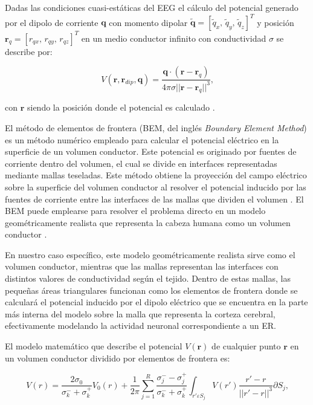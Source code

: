 Dadas las condiciones cuasi-estáticas del EEG \cite{Plonsey1967} el cálculo del potencial generado por el dipolo de corriente $\mathbf{q}$ con momento dipolar  $\mathbf{\tilde{q}} = [\tilde{q}_x,\,\tilde{q}_y,\,\tilde{q}_z]^T$ y posición $\mathbf{r}_{q} = [r_{qx},\,r_{qy},\,r_{qz}]^T$ en un medio conductor infinito con conductividad $\sigma$ se describe por:

\begin{equation}
	\label{fdip}
	V(\mathbf{r},\mathbf{r}_{dip},\mathbf{q})=\frac{\mathbf{q}\cdot(\mathbf{r}-\mathbf{r}_{q})}{4\pi \sigma {||\mathbf{r}-\mathbf{r}_{q}||}^{3}}\text{,}
\end{equation}

con $\mathbf{r}$ siendo la posición donde el potencial es calculado \cite{Hallez2007}.

El método de elementos de frontera (BEM, del inglés \emph{Boundary Element Method}) es un método numérico empleado para calcular el potencial eléctrico en la superficie de un volumen conductor. Este potencial es originado por fuentes de corriente dentro del volumen, el cual se divide en interfaces representadas mediante mallas teseladas. Este método obtiene la proyección del campo eléctrico sobre la superficie del volumen conductor al resolver el potencial inducido por las fuentes de corriente entre las interfaces de las mallas que dividen el volumen \cite{Hallez2007}. El BEM puede emplearse para resolver el problema directo en un modelo geométricamente realista que representa la cabeza humana como un volumen conductor \cite{Ermer2001}. 

En nuestro caso específico, este modelo geométricamente realista sirve como el volumen conductor, mientras que las mallas representan las interfaces con distintos valores de conductividad según el tejido. Dentro de estas mallas, las pequeñas áreas triangulares funcionan como los elementos de frontera donde se calculará el potencial inducido por el dipolo eléctrico que se encuentra en la parte más interna del modelo sobre la malla que representa la corteza cerebral, efectivamente modelando la actividad neuronal correspondiente a un ER.

El modelo matemático que describe el potencial $V(\mathbf{r})$ de cualquier punto $\mathbf{r}$ en un volumen conductor dividido por elementos de frontera es:

\begin{equation}
	\label{bem}
	V(r) = \frac{2\sigma_{0}}{\sigma_{k}^{-} + {\sigma_{k}^{+}}} V_{0}(r) + \frac{1}{2\pi} \sum_{j=1}^{R}\frac{\sigma_{j}^{-}-\sigma_{j}^{+}}{\sigma_{k}^{-}+\sigma_{k}^{+}} \int_{r'\varepsilon S_{j}} V(r') \frac{r'-r}{||r'-r||^3}\partial S_{j}\text{,}
\end{equation}

